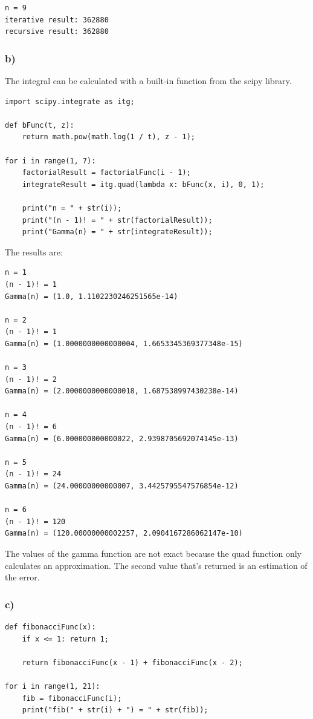 \begin{lstlisting}[caption=Result of 2.3 a), keywordstyle=\color{black}]
n = 9
iterative result: 362880
recursive result: 362880
\end{lstlisting}


\subsubsection{b)}

The integral can be calculated with a built-in function from the scipy library.

\begin{lstlisting}[caption=Problem 2.3 b)]
import scipy.integrate as itg;

def bFunc(t, z):
	return math.pow(math.log(1 / t), z - 1);

for i in range(1, 7):
	factorialResult = factorialFunc(i - 1);
	integrateResult = itg.quad(lambda x: bFunc(x, i), 0, 1);
	
	print("n = " + str(i));
	print("(n - 1)! = " + str(factorialResult));
	print("Gamma(n) = " + str(integrateResult));
\end{lstlisting}

The results are:

\begin{lstlisting}[caption=Result of 2.3 b), keywordstyle=\color{black}]
n = 1
(n - 1)! = 1
Gamma(n) = (1.0, 1.1102230246251565e-14)

n = 2
(n - 1)! = 1
Gamma(n) = (1.0000000000000004, 1.6653345369377348e-15)

n = 3
(n - 1)! = 2
Gamma(n) = (2.0000000000000018, 1.687538997430238e-14)

n = 4
(n - 1)! = 6
Gamma(n) = (6.000000000000022, 2.9398705692074145e-13)

n = 5
(n - 1)! = 24
Gamma(n) = (24.00000000000007, 3.4425795547576854e-12)

n = 6
(n - 1)! = 120
Gamma(n) = (120.00000000002257, 2.0904167286062147e-10)
\end{lstlisting}

The values of the gamma function are not exact because the quad function only calculates an approximation. The second value that's returned is an estimation of the error.

\subsubsection{c)}

\begin{lstlisting}[caption=Problem 2.3 c)]
def fibonacciFunc(x):
	if x <= 1: return 1;
	
	return fibonacciFunc(x - 1) + fibonacciFunc(x - 2);

for i in range(1, 21):
	fib = fibonacciFunc(i);
	print("fib(" + str(i) + ") = " + str(fib));
\end{lstlisting}

